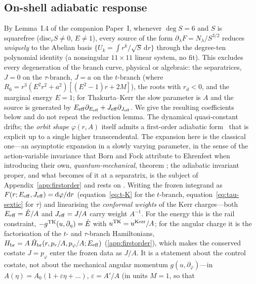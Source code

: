 \documentclass[12pt]{iopart}
\theoremstyle{plain}
\theoremstyle{definition}
\theoremstyle{remark}
\newcommand{\Ehat}{\hat E}
\newcommand{\dd}{\mathrm{d}}
\begin{document}
\subsection{On-shell adiabatic response}
\label{sec:adiabatic}
By Lemma~I.4 of the companion Paper~I, whenever $\deg S=6$ and $S$ is squarefree
($\mathrm{disc}_rS\neq0$, $E\neq1$), every source of the form
$\partial_\lambda F=N_\lambda/S^{3/2}$ reduces \emph{uniquely} to the Abelian basis
$\{U_k=\int r^k/\sqrt S\,\dd r\}$ through the degree-ten polynomial identity (a
nonsingular $11\times11$ linear system, no fit). This excludes every degeneration of the
branch curve, physical or algebraic: the separatrices, $J=0$ on the $\tau$-branch, $J=a$ on
the $t$-branch (where $R_6=r^3(E^2r^2+a^2)[(E^2-1)r+2M]$), the roots with $r_d<0$, and the
marginal energy $E=1$; for Thakurta--Kerr the slow parameter is
$A$ and the source is generated by $E_{\rm eff}\partial_{E_{\rm eff}}+J_{\rm
eff}\partial_{J_{\rm eff}}$. We give the resulting coefficients below and do not repeat
the reduction lemma. The dynamical quasi-constant drifts; the
\emph{orbit shape} $\varphi(r,A)$ itself admits a first-order adiabatic
form~\cite{BenderOrszag1999} that is explicit up to a single higher
transcendental. The expansion here is the classical one---an asymptotic expansion
in a slowly varying parameter, in the sense of the action-variable invariance that
Born and Fock attribute to Ehrenfest when introducing their own,
\emph{quantum-mechanical}, theorem \cite[p.~165]{BornFock1928}; the adiabatic
invariant proper, and what becomes of it at a separatrix, is the subject of
Appendix~\ref{app:firstorder} and rests on
\cite{Timofeev1978,CaryEscandeTennyson1986,Neishtadt1986}. Writing the frozen integrand as
$F(r;E_{\rm eff},J_{\rm eff})=\dd\varphi/\dd r$ (equation~\eqref{eq:t-K} for the
$t$-branch, equation~\eqref{eq:tau-sextic} for $\tau$) and linearising the
\emph{conformal weights} of the Kerr charges---both $E_{\rm eff}=\Ehat/A$ and
$J_{\rm eff}=J/A$ carry weight $A^{-1}$. For the energy this is the rail constraint,
$-g^{\rm TK}(u,\partial_\eta)=\Ehat$ with $u^{\rm TK}=u^{\rm Kerr}/A$; for the angular
charge it is the factorisation of the $t$- and $\tau$-branch Hamiltonians,
$H_{\rm br}=A\,\bar H_{\rm br}(r,p_r/A,p_\varphi/A;E_{\rm eff})$
(\ref{app:firstorder}), which makes the conserved costate $J=p_\varphi$ enter the frozen
data as $J/A$. It is a statement about the control costate, not about the mechanical
angular momentum $g(u,\partial_\varphi)$---in
$A(\eta)=A_0(1+\varepsilon\eta+\dots)$, $\varepsilon=A'/A$ (in units $M=1$, so that
\end{document}
